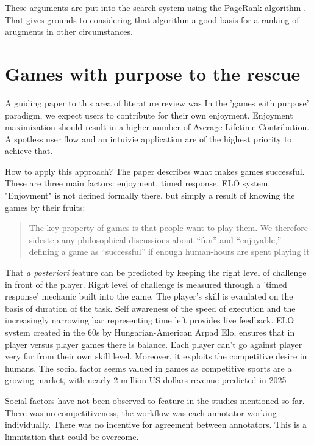 \documentclass{report}
\begin{document}
These arguments are put into the search system using the PageRank algorithm \cite{brin_anatomy_1998}.  That gives grounds to considering that algorithm a good basis for a ranking of arugments in other circumstances.

\section{Games with purpose to the rescue}
A guiding paper to this area of literature review was \cite{von_ahn_designing_2008} 
In the 'games with purpose' paradigm, we expect users to contribute for their own enjoyment. Enjoyment maximization should result in a higher number of Average Lifetime Contribution.  A spotless user flow and an intuivie application are of the highest priority to achieve that.

How to apply this approach? The paper describes what makes games successful.
These are three main factors: enjoyment, timed response, ELO system.
"Enjoyment" is not defined formally there, but simply a result of knowing the games by their fruits:

\begin{quote}
 The key property of games is that people want to play them. We therefore sidestep any philosophical discussions about “fun” and “enjoyable,” defining a game as “successful” if enough human-hours are spent playing it
\end{quote}
That  \textit{a posteriori} feature can be predicted by keeping the right level of challenge in front of the player.  \cite{locke_theory_1991}
Right level of challenge is measured through a 'timed response' mechanic built into the game.
The player's skill is evaulated on the basis of duration of the task. 
Self awareness of the speed of execution and the increasingly narrowing bar representing time left provides live feedback.
ELO system \cite{noauthor_elo_2023} created in the 60s by Hungarian-American Arpad Elo, ensures that in player versus player games there is balance. Each player can't go against player very far from their own skill level.
Moreover, it exploits the competitive desire in humans.
The social factor seems valued in games as competitive sports are a growing market, with nearly 2 million US dollars revenue predicted \cite{noauthor_global_nodate} in 2025

Social factors have not been observed to feature in the studies mentioned so far.
There was no competitiveness, the workflow was each annotator working individually.
There was no incentive for agreement between annotators.
This is a limnitation that could be overcome.
\end{document}
